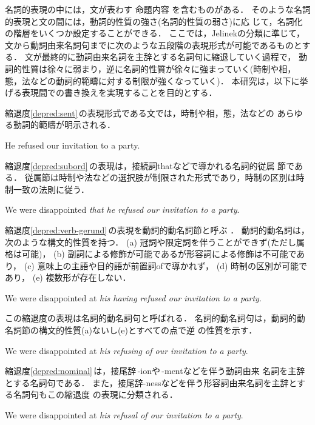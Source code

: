 名詞的表現の中には，文が表わす
命題内容
を含むものがある．
そのような名詞的表現と文の間には，動詞的性質の強さ(名詞的性質の弱さ)に応
じて，名詞化の階層をいくつか設定することができる\cite{Jelinek66,Lees68}． 
ここでは，Jelinekの分類に準じて，
文から動詞由来名詞句までに次のような五段階の表現形式が可能であるものとする．
文が最終的に動詞由来名詞を主辞とする名詞句に縮退していく過程で，
動詞的性質は徐々に弱まり，逆に名詞的性質が徐々に強まっていく(時制や相，
態，法などの動詞的範疇に対する制限が強くなっていく)．
本研究は，以下に挙げる表現間での書き換えを実現することを目的とする．
\begin{DEPRED}
\depred\label{depred:sent}
縮退度\ref{depred:sent}\,の表現形式である文では，時制や相，態，法などの
あらゆる動詞的範疇が明示される．
\begin{DEPEX}
\depexample He refused our invitation to a party.
\end{DEPEX}
\depred\label{depred:subord}
縮退度\ref{depred:subord}\,の表現は，接続詞thatなどで導かれる名詞的従属
節である．
従属節は時制や法などの選択肢が制限された形式であり，時制の区別は時
制一致の法則に従う．
\begin{DEPEX}
\depexample We were disappointed {\it that he refused our invitation to 
a party}.
\end{DEPEX}
\depred\label{depred:verb-gerund}
縮退度\ref{depred:verb-gerund}\,の表現を動詞的動名詞節と呼ぶ
\cite{Yasui82,Declerck94}． 
動詞的動名詞は，次のような構文的性質を持つ．
(a) 冠詞や限定詞を伴うことができず(ただし属格は可能)，
(b) 副詞による修飾が可能であるが形容詞による修飾は不可能であり，
(c) 意味上の主語や目的語が前置詞ofで導かれず，
(d) 時制の区別が可能であり，
(e) 複数形が存在しない\cite{Inui54,Ota74,Yasui82,Declerck94}．
\begin{DEPEX}
\depexample We were disappointed at {\it his having refused our 
invitation to a party}.
\end{DEPEX}
\depred\label{depred:noun-gerund}
この縮退度の表現は名詞的動名詞句と呼ばれる．
名詞的動名詞句は，動詞的動名詞節の構文的性質(a)ないし(e)とすべての点で逆
の性質を示す．
\begin{DEPEX}
\depexample We were disappointed at {\it his refusing of our invitation 
to a party}. 
\end{DEPEX}
\depred\label{depred:nominal}
縮退度\ref{depred:nominal}\,は，接尾辞\,-ionや\,-mentなどを伴う動詞由来
名詞を主辞とする名詞句である．
また，接尾辞-nessなどを伴う形容詞由来名詞を主辞とする名詞句もこの縮退度
の表現に分類される． 
\begin{DEPEX}
\depexample We were disappointed at {\it his refusal of our invitation 
to a party}. 
\end{DEPEX}
\end{DEPRED}

